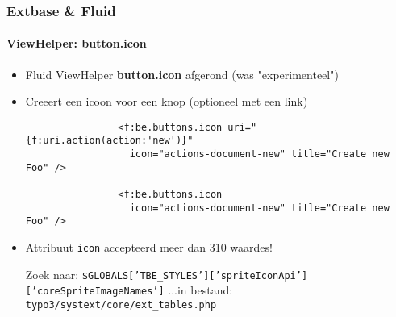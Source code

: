 \begin{frame}[fragile]
	\frametitle{Extbase \& Fluid}
	\framesubtitle{ViewHelper: button.icon}

	\lstset{
		basicstyle=\smaller\ttfamily
	}

	\begin{itemize}
		\item Fluid ViewHelper \textbf{button.icon} afgerond (was "experimenteel")
		\item Creeert een icoon voor een knop (optioneel met een link)

			\begin{lstlisting}
				<f:be.buttons.icon uri="{f:uri.action(action:'new')}"
				  icon="actions-document-new" title="Create new Foo" />

				<f:be.buttons.icon
				  icon="actions-document-new" title="Create new Foo" />
			\end{lstlisting}

		\item Attribuut \texttt{icon} accepteerd meer dan 310 waardes!\newline

			\smaller
				Zoek naar:\newline
				\texttt{\$GLOBALS['TBE\_STYLES']['spriteIconApi']['coreSpriteImageNames']}\newline
				...in bestand:\newline
				\texttt{typo3/systext/core/ext\_tables.php}
			\normalsize

	\end{itemize}

\end{frame}


